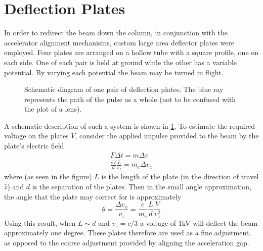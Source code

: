 \section{Deflection Plates}

In order to redirect the beam down the column, in conjunction with the accelerator alignment mechanisms, custom large area deflector plates were employed.
Four plates are arranged on a hollow tube with a square profile, one on each side.
One of each pair is held at ground while the other has a variable potential.
By varying each potential the beam may be turned in flight.

\begin{figure}
  \centering
  
  \caption{
    Schematic diagram of one pair of deflection plates.
    The blue ray represents the path of the pulse as a whole (not to be confused with the plot of a lens).
  }
  \label{fig:deflector_schematic}
\end{figure}

A schematic description of such a system is shown in \ref{fig:deflector_schematic}.
To estimate the required voltage on the plates $V$, consider the applied impulse provided to the beam by the plate's electric field
\begin{gather}
  F \Delta t = m \Delta v \\
  \frac{ e V }{ d } \frac{ L }{ v_z } = m_e \Delta v_x
\end{gather}
where (as seen in the figure) $L$ is the length of the plate (in the direction of travel $\hat{z}$) and $d$ is the separation of the plates.
Then in the small angle approximation, the angle that the plate may correct for is approximately
\begin{equation}
  \theta = \frac{ \Delta v_x }{ v_z } = \frac{ e }{ m_e } \frac{ L }{ d } \frac{ V }{ v_z^2 }
\end{equation}
Using this result, when $L \sim d$ and $v_z = c/3$ a voltage of 1kV will deflect the beam approximately one degree.
These plates therefore are used as a fine adjustment, as opposed to the coarse adjustment provided by aligning the acceleration gap.
